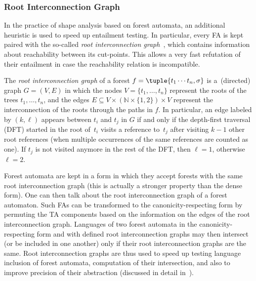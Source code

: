 \subsubsection*{Root Interconnection Graph}
\label{sec:icgraph}

In the practice of shape analysis based on forest automata, an additional heuristic is used to speed up entailment testing.
In particular, every FA is kept paired with the so-called \emph{root interconnection
graph}~\cite{jiri:diza}, which contains information about reachability between
its cut-points.
This allows a very fast refutation of their entailment in case the reachability
relation is incompatible. 

The \emph{root interconnection graph} of a forest $f = \tuple{t_1\cdots t_n,\sigma}$
 is a~(directed) graph $G = (V,E)$ in which the nodes $V=\{t_1,\dots,t_n\}$
represent the roots of the trees $t_1,\ldots,t_n$, and the edges $E \subseteq V \times (\mathbb{N} \times \{1,2\}) \times V$
represent the interconnection of the roots through the paths in $f$.
%
In particular, an edge labeled by $(k,\ell)$ appears between $t_i$ and $t_j$ in $G$
if and only if the depth-first traversal (DFT) started in the root of~$t_i$
visits a reference to~$t_j$
after visiting $k-1$ other root references (when multiple occurrences
of the same references are counted as one). If $t_j$ is not visited anymore in the rest of
the DFT, then $\ell = 1$, otherwise $\ell = 2$.

Forest automata are kept in a form in which they accept forests with the same
root interconnection graph (this is actually a stronger property than the
dense form). 
One can then talk about the root interconnection graph of a forest automaton.
Such FAs can be transformed to the canonicity-respecting form by permuting
the TA components based on the information on the edges of the root
interconnection graph.
Languages of two forest automata in the canonicity-respecting form and with
defined root interconnection graphs may then intersect (or be included in one
another) only if their root interconnection graphs are the same.
%
Root interconnection graphs are thus used to speed up testing language
inclusion of forest automata, computation of their intersection, and also to
improve precision of their abstraction (discussed in detail
in~\cite{jiri:diza}).




